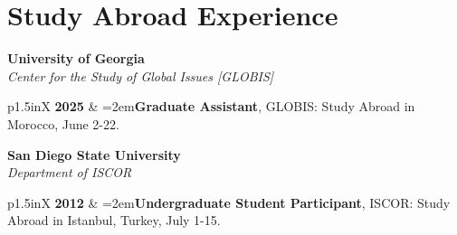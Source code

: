 \documentclass[letterpaper,12pt]{article}
\begin{document}
\section{Study Abroad Experience}
\textbf{University of Georgia}\\
\textit{Center for the Study of Global Issues [GLOBIS]}
\begin{xltabular}{\dimexpr\textwidth-0in}{p{1.5in}X}
\textbf{2025} & \hangindent=2em\textbf{Graduate Assistant}, GLOBIS: Study Abroad in Morocco, June 2-22.
\end{xltabular}

\textbf{San Diego State University}\\
\textit{Department of ISCOR}
\begin{xltabular}{\dimexpr\textwidth-0in}{p{1.5in}X}
\textbf{2012} & \hangindent=2em\textbf{Undergraduate Student Participant}, ISCOR: Study Abroad in Istanbul, Turkey, July 1-15.
\end{xltabular}

\end{document}
